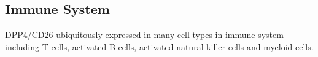 \subsection{Immune System}
DPP4/CD26 ubiquitously expressed in many cell types in immune system including T cells, activated B cells, activated natural killer cells and myeloid cells. 